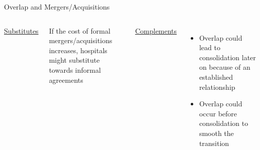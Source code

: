 \documentclass[notes,11pt, aspectratio=169]{beamer}
\newenvironment{wideitemize}{\itemize\addtolength{\itemsep}{10pt}}{\enditemize}
\begin{document}
\begin{frame}{Overlap and Mergers/Acquisitions}

\vspace{2mm}
\begin{columns}[T]
        \centering
        \underline{Substitutes}

        \vspace{3mm}

        \begin{wideitemize}
        \item If the cost of formal mergers/acquisitions increases, hospitals might substitute towards informal agreements
        \end{wideitemize}

        \centering
        \underline{Complements}

        \vspace{3mm}

        \begin{itemize}
            \item Overlap could lead to consolidation later on because of an established relationship
            \item Overlap could occur before consolidation to smooth the transition
        \end{itemize}
    \end{columns}

   
\end{frame}



\end{document}
